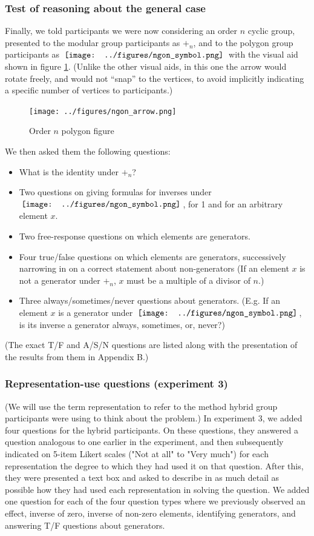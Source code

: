 \documentclass[man,mask,10pt]{apa6}
\newcommand{\ngon}{\,\vcenter{\hbox{\texttt{[image: ../figures/ngon\_symbol.png]}}}\,}
\begin{document}
\subsubsection{Test of reasoning about the general case}
Finally, we told participants we were now considering an order $n$ cyclic group, presented to the modular group participants as $+_n$, and to the polygon group participants as $\ngon$ with the visual aid shown in figure \ref{ngonex}. (Unlike the other visual aids, in this one the arrow would rotate freely, and would not ``snap'' to the vertices, to avoid implicitly indicating a specific number of vertices to participants.) 
\begin{figure} \centering \texttt{[image: ../figures/ngon\_arrow.png]} \caption{Order $n$ polygon figure} \label{ngonex} \end{figure} \noindent
We then asked them the following questions: 
\begin{itemize}
\item What is the identity under $+_n$?
\item Two questions on giving formulas for inverses under $\ngon$, for 1 and for an arbitrary element $x$.
\item Two free-response questions on which elements are generators. 
\item Four true/false questions on which elements are generators, successively narrowing in on a correct statement about non-generators (If an element $x$ is not a generator under $+_n$, $x$ must be a multiple of a divisor of $n$.)
\item Three always/sometimes/never questions about generators. (E.g. If an element $x$ is a generator under $\ngon$, is its inverse a generator always, sometimes, or, never?) 
\end{itemize}
(The exact T/F and A/S/N questions are listed along with the presentation of the results from them in Appendix B.)
\subsubsection{Representation-use questions (experiment 3)}
(We will use the term representation to refer to the method hybrid group participants were using to think about the problem.) In experiment 3, we added four questions for the hybrid participants. On these questions, they answered a question analogous to one earlier in the experiment, and then subsequently indicated on 5-item Likert scales ("Not at all" to "Very much") for each representation the degree to which they had used it on that question. After this, they were presented a text box and asked to describe in as much detail as possible how they had used each representation in solving the question. We added one question for each of the four question types where we previously observed an effect, inverse of zero, inverse of non-zero elements, identifying generators, and answering T/F questions about generators.
\end{document}
